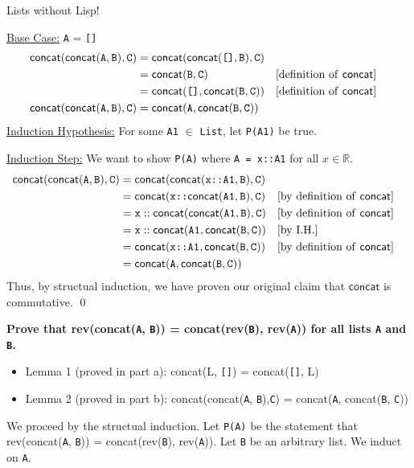 \documentclass[11pt, nopagenumbers]{adamblan-hw}
\newcommand{\RR}{\mathbb{R}}
\newcommand{\fconcat}{\textsf{concat}}
\newcommand{\frev}{\textsf{rev}}
\newcommand{\emptylist}{\texttt{[]}}
\newcommand{\T}[1]{\texttt{#1}}
\newcommand{\List}{\texttt{List}}
\begin{document}
\begin{question}{\color{red} Lists without Lisp!}
\begin{part}
\underline{Base Case:} \T{A} = \emptylist
\begin{align*}
\fconcat(\fconcat(\T{A}, \T{B}),\T{C}) &= \fconcat(\fconcat(\emptylist, \T{B}),\T{C}) \\
&= \fconcat(\T{B}, \T{C}) && \text{[definition of \fconcat]} \\
&= \fconcat(\emptylist, \fconcat(\T{B}, \T{C})) && \text{[definition of \fconcat]}\\
\fconcat(\fconcat(\T{A}, \T{B}),\T{C}) &= \fconcat(\T{A}, \fconcat(\T{B}, \T{C})) \\
\end{align*}
\underline{Induction Hypothesis:} For some \T{A1} $\in$ \List, let \T{P(A1)} be true.

\underline{Induction Step:} We want to show \T{P(A)} where \T{A = x::A1} for all $x \in \RR$.
\begin{align*}
\fconcat(\fconcat(\T{A}, \T{B}),\T{C}) &=  \fconcat(\fconcat(\T{x::A1}, \T{B}),\T{C})\\
&= \fconcat(\T{x::}\fconcat(\T{A1}, \T{B}), \T{C}) && \text{[by definition of \fconcat]} \\
&= \T{x}::\fconcat(\fconcat(\T{A1}, \T{B}), \T{C}) && \text{[by definition of \fconcat]} \\
&= \T{x}::\fconcat(\T{A1}, \fconcat(\T{B}, \T{C})) && \text{[by I.H.]}\\
&= \fconcat(\T{x::}\T{A1}, \fconcat(\T{B}, \T{C})) && \text{[by definition of \fconcat]} \\
&= \fconcat(\T{A}, \fconcat(\T{B}, \T{C})) \\
\end{align*}
Thus, by structual induction, we have proven our original claim that $\fconcat$ is commutative. \qed
\end{part}

\pagebreak
\begin{part} \textbf{Prove that \frev(\fconcat(\T{A}, \T{B})) = \fconcat(\frev(\T{B}), \frev(\T{A})) for all lists \T{A} and \T{B}.}

\begin{itemize}
\item Lemma 1 (proved in part a): \fconcat(L, \emptylist) = \fconcat(\emptylist, L)
\item Lemma 2 (proved in part b): \fconcat(\fconcat(\T{A}, \T{B}),\T{C}) = \fconcat(\T{A}, \fconcat(\T{B}, \T{C})) \\
\end{itemize}
We proceed by the structual induction. Let \T{P(A)} be the statement that \\ \frev(\fconcat(\T{A}, \T{B})) = \fconcat(\frev(\T{B}), \frev(\T{A})).
Let \T{B} be an arbitrary list. We induct on \T{A}.


\end{part}
\end{question}
\end{document}
